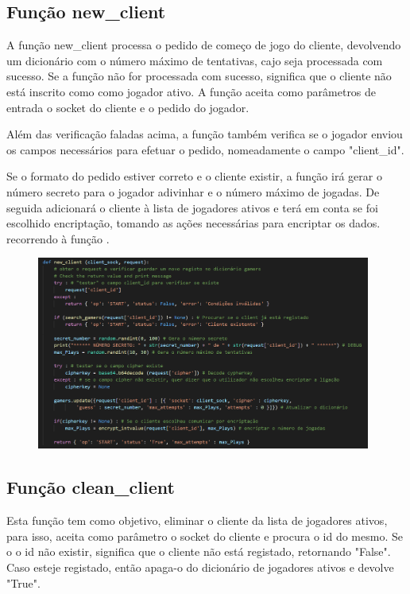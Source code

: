 \documentclass{report}
\begin{document}
\subsection{Função new\_client}
\label{ssec:func_new_client}

A função new\_client processa o pedido de começo de jogo do cliente, devolvendo um dicionário com o número máximo de tentativas, cajo seja processada com sucesso. Se a função não for processada com sucesso, significa que o cliente não está inscrito como como jogador ativo. A função aceita como parâmetros de entrada o socket do cliente e o pedido do jogador.

Além das verificação faladas acima, a função também verifica se o jogador enviou os campos necessários para efetuar o pedido, nomeadamente o campo "client\_id".

Se o formato do pedido estiver correto e o cliente existir, a função irá gerar o número secreto para o jogador adivinhar e o número máximo de jogadas. De seguida adicionará o cliente à lista de jogadores ativos e terá em conta se foi escolhido encriptação, tomando as ações necessárias para encriptar os dados. recorrendo à função  .

\begin{figure}[!h]
\center
\includegraphics[height = 180pt]{img/newclient.png}
\end{figure}

\subsection{Função clean\_client}
\label{ssec:func_clean_client}

Esta função tem como objetivo, eliminar o cliente da lista de jogadores ativos, para isso, aceita como parâmetro o socket do cliente e procura o id do mesmo. Se o o id não existir, significa que o cliente não está registado, retornando "False". Caso esteje registado, então apaga-o do dicionário de jogadores ativos e devolve "True".
\end{document}
